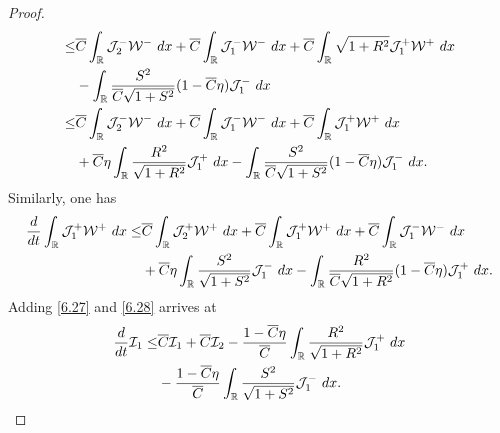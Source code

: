 \documentclass[10pt,a4paper]{amsart}
\newcommand{\fr}{\frac}
\begin{document}
\begin{proof}
\begin{align}
\begin{split}
\leq &\overline{C}\int_{\mathbb{R}} \mathcal{J}_{2}^-\mathcal{W}^-\ {\rm d}x +\overline{C}\int_{\mathbb{R}} \mathcal{J}_{1}^-\mathcal{W}^-\ {\rm d}x  +\overline{C}\int_{\mathbb{R}}\sqrt{1+R^2}\mathcal{J}_{1}^+\mathcal{W}^+\ {\rm d}x  \\ & -\int_{\mathbb{R}}\fr{S^2}{\overline{C}\sqrt{1+S^2}}(1-\overline{C}\eta)\mathcal{J}_{1}^-\ {\rm d}x \\
\leq & \overline{C}\int_{\mathbb{R}} \mathcal{J}_{2}^-\mathcal{W}^-\ {\rm d}x +\overline{C}\int_{\mathbb{R}} \mathcal{J}_{1}^-\mathcal{W}^-\ {\rm d}x  +\overline{C}\int_{\mathbb{R}}\mathcal{J}_{1}^+\mathcal{W}^+\ {\rm d}x  \\ & +\overline{C}\eta\int_{\mathbb{R}}\fr{R^2}{\sqrt{1+R^2}}\mathcal{J}_{1}^+ \ {\rm d}x -\int_{\mathbb{R}}\fr{S^2}{\overline{C}\sqrt{1+S^2}}(1-\overline{C}\eta)\mathcal{J}_{1}^-\ {\rm d}x.
\end{split}
\end{align}
Similarly, one has
\begin{align}\label{6.28}
\begin{split}
\fr{{\rm d}}{{\rm d}t}\int_{\mathbb{R}} \mathcal{J}_{1}^+\mathcal{W}^+\ {\rm d}x
\leq &\overline{C}\int_{\mathbb{R}} \mathcal{J}_{2}^+\mathcal{W}^+\ {\rm d}x +\overline{C}\int_{\mathbb{R}} \mathcal{J}_{1}^+\mathcal{W}^+\ {\rm d}x  +\overline{C}\int_{\mathbb{R}}\mathcal{J}_{1}^-\mathcal{W}^-\ {\rm d}x  \\ & +\overline{C}\eta\int_{\mathbb{R}}\fr{S^2}{\sqrt{1+S^2}}\mathcal{J}_{1}^- \ {\rm d}x -\int_{\mathbb{R}}\fr{R^2}{\overline{C}\sqrt{1+R^2}}(1-\overline{C}\eta)\mathcal{J}_{1}^+\ {\rm d}x.
\end{split}
\end{align}
Adding \eqref{6.27} and \eqref{6.28} arrives at
\begin{align}\label{6.29}
\begin{split}
\fr{{\rm d}}{{\rm d}t}\mathcal{I}_1
\leq &\overline{C}\mathcal{I}_1 + \overline{C}\mathcal{I}_2 -\fr{1-\overline{C}\eta}{\overline{C}}\int_{\mathbb{R}}\fr{R^2}{\sqrt{1+R^2}}\mathcal{J}_{1}^+\ {\rm d}x \\
&-\fr{1-\overline{C}\eta}{\overline{C}}\int_{\mathbb{R}}\fr{S^2}{\sqrt{1+S^2}}\mathcal{J}_{1}^-\ {\rm d}x.
\end{split}
\end{align}


\end{proof}
\end{document}
